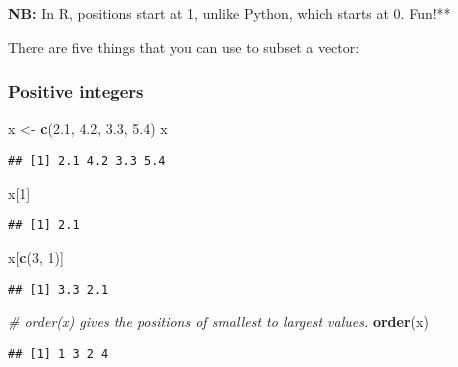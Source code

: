 \documentclass[
]{book}
\newenvironment{Shaded}{\begin{snugshade}}{\end{snugshade}}
\newcommand{\CommentTok}[1]{\textcolor[rgb]{0.56,0.35,0.01}{\textit{#1}}}
\newcommand{\DecValTok}[1]{\textcolor[rgb]{0.00,0.00,0.81}{#1}}
\newcommand{\FloatTok}[1]{\textcolor[rgb]{0.00,0.00,0.81}{#1}}
\newcommand{\KeywordTok}[1]{\textcolor[rgb]{0.13,0.29,0.53}{\textbf{#1}}}
\newcommand{\NormalTok}[1]{#1}
\newcommand{\StringTok}[1]{\textcolor[rgb]{0.31,0.60,0.02}{#1}}
\begin{document}
\textbf{NB:} In R, positions start at 1, unlike Python, which starts at 0. Fun!**

There are five things that you can use to subset a vector:

\hypertarget{positive-integers}{%
\subsubsection{Positive integers}\label{positive-integers}}

\begin{Shaded}
\begin{Highlighting}[]
\NormalTok{x \textless{}{-}}\StringTok{ }\KeywordTok{c}\NormalTok{(}\FloatTok{2.1}\NormalTok{, }\FloatTok{4.2}\NormalTok{, }\FloatTok{3.3}\NormalTok{, }\FloatTok{5.4}\NormalTok{)}
\NormalTok{x}
\end{Highlighting}
\end{Shaded}

\begin{verbatim}
## [1] 2.1 4.2 3.3 5.4
\end{verbatim}

\begin{Shaded}
\begin{Highlighting}[]
\NormalTok{x[}\DecValTok{1}\NormalTok{]}
\end{Highlighting}
\end{Shaded}

\begin{verbatim}
## [1] 2.1
\end{verbatim}

\begin{Shaded}
\begin{Highlighting}[]
\NormalTok{x[}\KeywordTok{c}\NormalTok{(}\DecValTok{3}\NormalTok{, }\DecValTok{1}\NormalTok{)]}
\end{Highlighting}
\end{Shaded}

\begin{verbatim}
## [1] 3.3 2.1
\end{verbatim}

\begin{Shaded}
\begin{Highlighting}[]
\CommentTok{\# \textasciigrave{}order(x)\textasciigrave{} gives the positions of smallest to largest values.}
\KeywordTok{order}\NormalTok{(x)}
\end{Highlighting}
\end{Shaded}

\begin{verbatim}
## [1] 1 3 2 4
\end{verbatim}
\end{document}
